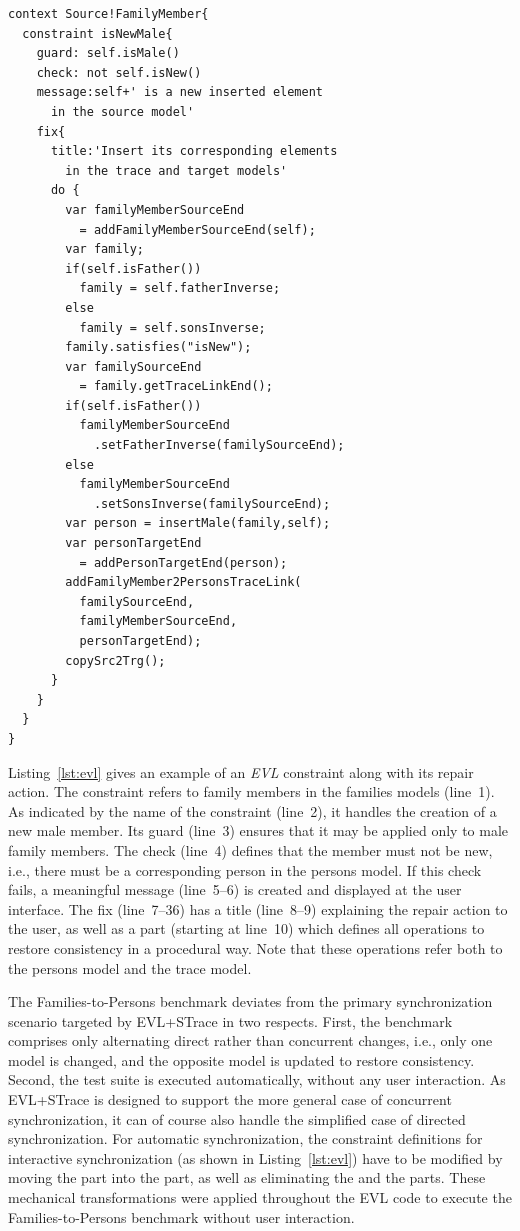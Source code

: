 \begin{lstlisting}[label={lst:evl}, float=b!, language=evl, caption={Example of an EVL constraint}]
context Source!FamilyMember{
  constraint isNewMale{
    guard: self.isMale()
    check: not self.isNew()
    message:self+' is a new inserted element 
      in the source model'
    fix{
      title:'Insert its corresponding elements 
        in the trace and target models'
      do {
        var familyMemberSourceEnd 
          = addFamilyMemberSourceEnd(self);
        var family;
        if(self.isFather()) 
          family = self.fatherInverse;
        else 
          family = self.sonsInverse;
        family.satisfies("isNew");
        var familySourceEnd 
          = family.getTraceLinkEnd(); 
        if(self.isFather()) 
          familyMemberSourceEnd
            .setFatherInverse(familySourceEnd);			
        else 
          familyMemberSourceEnd
            .setSonsInverse(familySourceEnd);			
        var person = insertMale(family,self);
        var personTargetEnd 
          = addPersonTargetEnd(person);
        addFamilyMember2PersonsTraceLink(
          familySourceEnd, 
          familyMemberSourceEnd, 
          personTargetEnd);
        copySrc2Trg();
      }
    }
  }
}
\end{lstlisting}

Listing~\ref{lst:evl} gives an example of an \emph{EVL} constraint along with its repair action. The constraint refers to family members in the families models (line~1).
As indicated by the name of the constraint (line~2), it handles the creation of a new male member.
Its guard (line~3) ensures that it may be applied only to male family members.
The check (line~4) defines that the member must not be new, i.e., there must be a corresponding person in the persons model.
If this check fails, a meaningful message (line~5--6) is created and displayed at the user interface.
The fix (line~7--36) has a title (line~8--9) explaining the repair action to the user, as well as a  part (starting at line~10) which defines all operations to restore consistency in a procedural way.
Note that these operations refer both to the persons model and the trace model.

The Families-to-Persons benchmark deviates from the primary synchronization scenario targeted by EVL\-+\-STrace in two respects.
First, the benchmark comprises only alternating direct rather than concurrent changes, i.e., only one model is changed, and the opposite model is updated to restore consistency.
Second, the test suite is executed automatically, without any user interaction.
%
As EVL+STrace is designed to support the more general case of concurrent synchronization, it can of course also handle the simplified case of directed synchronization.
For automatic synchronization, the constraint definitions for interactive synchronization (as shown in Listing~\ref{lst:evl}) have to be modified by moving the  part into the  part, as well as eliminating the  and the  parts.
These mechanical transformations were applied throughout the EVL code to execute the Families-to-Persons benchmark without user interaction.


